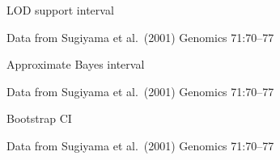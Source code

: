 \documentclass[aspectratio=169,12pt,t]{beamer}
\begin{document}
\begin{frame}{}


\note{
}
\end{frame}



\begin{frame}{LOD support interval}



\vfill

\hfill {\footnotesize \lolit Data from Sugiyama et al.\ (2001) Genomics 71:70--77}

\note{
}

\end{frame}




\begin{frame}{Approximate Bayes interval}



\vfill

\hfill {\footnotesize \lolit Data from Sugiyama et al.\ (2001) Genomics 71:70--77}

\note{
}
\end{frame}



\begin{frame}{Bootstrap CI}



\vfill

\hfill {\footnotesize \lolit Data from Sugiyama et al.\ (2001) Genomics 71:70--77}

\note{
}
\end{frame}











\begin{frame}{}


\note{
}
\end{frame}
\end{document}
